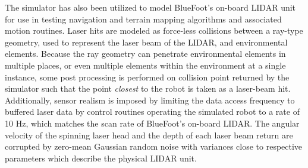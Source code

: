 		The simulator has also been utilized to model BlueFoot's on-board LIDAR unit for use in testing navigation and terrain mapping algorithms and associated motion routines. Laser hits are modeled as force-less collisions between a ray-type geometry, used to represent the laser beam of the LIDAR, and environmental elements. Because the ray geometry can penetrate environmental elements in multiple places, or even multiple elements within the environment at a single instance, some post processing is performed on collision point returned by the simulator such that the point \emph{closest} to the robot is taken as a laser-beam hit. Additionally, sensor realism is imposed by limiting the data access frequency to buffered laser data by control routines operating the simulated robot to a rate of 10 Hz, which matches the scan rate of BlueFoot's on-board LIDAR. The angular velocity of the spinning laser head and the depth of each laser beam return are corrupted by zero-mean Gaussian random noise with variances close to respective parameters which describe the physical LIDAR unit.
